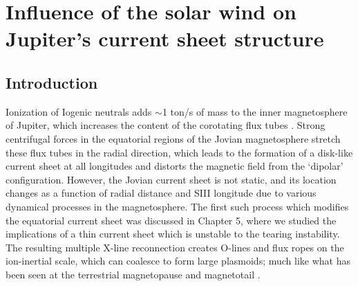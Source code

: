 \chapter{Influence of the solar wind on Jupiter's current sheet structure}

\section{Introduction}

Ionization of Iogenic neutrals adds  $\sim$1 ton/s of mass to the inner magnetosphere of Jupiter, which increases the content of the corotating flux tubes \cite{Bagenal2011b}. Strong centrifugal forces in the equatorial regions of the Jovian magnetosphere stretch these flux tubes in the radial direction, which leads to the formation of a disk-like current sheet at all longitudes \cite{Khurana2004a} and distorts the magnetic field from the `dipolar' configuration. However, the Jovian current sheet is not static, and its location changes as a function of radial distance and SIII longitude due to various dynamical processes in the magnetosphere. The first such process which modifies the equatorial current sheet was discussed in Chapter 5, where we studied the implications of a thin current sheet which is unstable to the tearing instability. The resulting multiple X-line reconnection creates O-lines and flux ropes on the ion-inertial scale, which can coalesce to form large plasmoids; much like what has been seen at the terrestrial magnetopause and magnetotail \cite{AkhavanTafti2020ComparativeEvents, Eastwood2005ObservationsStudy}.

